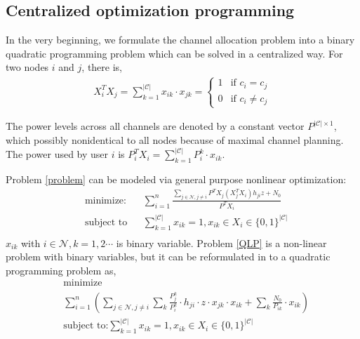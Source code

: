 \subsection{Centralized optimization programming}
In the very beginning, we formulate the channel allocation problem into a binary quadratic programming problem which can be solved in a centralized way.  For two nodes $i$ and $j$, there is,
\begin{equation}
\begin{split}
X_i^TX_j = \sum\limits_{k=1}^{|\mathcal{C}|}x_{ik}\cdot x_{jk} = 
\left\{ \begin{array}{ll}
1 & \mbox{if $c_i=c_j$} \\
0 & \mbox{if $c_i\neq c_j$} 
\end{array}
\right.
\end{split}
\end{equation}

The power levels across all channels are denoted by a constant vector $P^{|\mathcal{C}|\times 1}$, which possibly nonidentical to all nodes because of maximal channel planning. The power used by user $i$ is $P_i^TX_i = \sum\limits_{k=1}^{|\mathcal{C}|}P_{i}^k\cdot x_{ik}$.


Problem \ref{problem} can be modeled via general purpose nonlinear optimization:
	\begin{equation}
\label{QLP}
		\begin{aligned}
		& \underset{}{\text{minimize:}}
		& & \sum\limits^{n}_{i=1} \frac{\sum\limits_{j\in\mathcal{N}, j\neq i}P^TX_j(X_j^TX_i)h_{ji}z + N_0}{P^TX_i}\\
		& \text{subject to}
		& & \sum\limits_{k=1}^{|\mathcal{C}|}x_{ik}=1, x_{ik}\in X_i\in \{0,1\}^{|\mathcal{C}|}\\
		\end{aligned}
	\end{equation}
$x_{ik}$ with $i\in \mathcal{N}, k=1,2\cdots$ is binary variable. Problem \ref{QLP} is a non-linear problem with binary variables, but it can be reformulated in to a quadratic programming problem as,
	\begin{equation}
\label{QLP_2}
			\begin{aligned}
			& \underset{}{\text{minimize}}\\
			&\sum\limits^{n}_{i=1}(\sum\limits_{j\in\mathcal{N}, j\neq i}\sum\limits_k \frac{P_{j}^k}{P_{i}^k}\cdot h_{ji}\cdot z\cdot x_{jk}\cdot x_{ik} + \sum\limits_k \frac{N_0}{P_{ik}}\cdot x_{ik})\\
			& \text{subject to:} 
			\sum\limits_{k=1}^{|\mathcal{C}|}x_{ik}=1, x_{ik}\in X_i\in \{0,1\}^{|\mathcal{C}|}\\
			\end{aligned}
		\end{equation}


